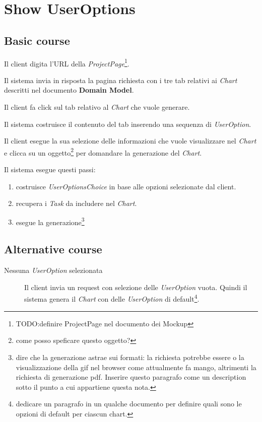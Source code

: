 \section{Show UserOptions}
\label{seq:showUserOptions}
\subsection{Basic course}
Il client digita l'URL della \emph{ProjectPage}\footnote{TODO:definire
ProjectPage nel documento dei Mockup}. 

Il sistema invia in risposta la pagina richiesta con i tre tab relativi ai
\emph{Chart} descritti nel documento \textbf{Domain Model}. 

Il client fa click sul tab relativo al \emph{Chart} che vuole generare.

Il sistema costruisce il contenuto del tab inserendo una sequenza di
\emph{UserOption}. 

Il client esegue la sua selezione delle informazioni che
vuole visualizzare nel \emph{Chart} e clicca su un oggetto\footnote{come posso
speficare questo oggetto?} per domandare la generazione del \emph{Chart}.

Il sistema esegue questi passi:
\begin{enumerate}
  \item costruisce \emph{UserOptionsChoice} in base alle opzioni selezionate
  dal client.
  \item recupera i \emph{Task} da includere nel \emph{Chart}.
  \item esegue la generazione\footnote{dire che la generazione astrae sui
  formati: la richiesta potrebbe essere o la visualizzazione della gif nel
  browser come attualmente fa mango, altrimenti la richiesta di generazione
  pdf. Inserire questo paragrafo come un description sotto il punto a cui
  appartiene questa nota.}
\end{enumerate}

\subsection{Alternative course}
\begin{description}
\item[Nessuna \emph{UserOption} selezionata] Il client invia un request con 
selezione delle \emph{UserOption} vuota. Quindi il sistema genera il
\emph{Chart} con delle \emph{UserOption} di default\footnote{dedicare un
paragrafo in un qualche documento per definire quali sono le opzioni di
default per ciascun chart.}.
\end{description}